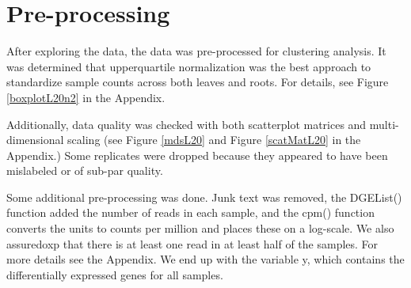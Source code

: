 \documentclass{article}
\begin{document}
\section*{Pre-processing}

After exploring the data, the data was pre-processed for clustering analysis. It was determined that upperquartile normalization was the best approach to standardize sample counts across both leaves and roots. For details, see Figure \ref{boxplotL20n2} in the Appendix.

Additionally, data quality was checked with both scatterplot matrices and multi-dimensional scaling (see Figure \ref{mdsL20} and Figure \ref{scatMatL20} in the Appendix.) Some replicates were dropped because they appeared to have been mislabeled or of sub-par quality.

Some additional pre-processing was done. Junk text was removed, the DGEList() function added the number of reads in each sample, and the cpm() function converts the units to counts per million and places these on a log-scale. We also assuredoxp that there is at least one read in at least half of the samples. For more details see the Appendix. We end up with the variable y, which contains the differentially expressed genes for all samples.
\end{document}
